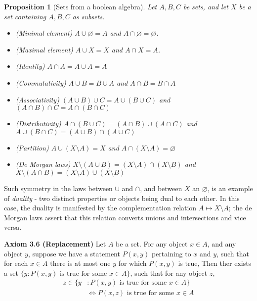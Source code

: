 \documentclass[
]{book}
\providecommand{\tightlist}{%
  \setlength{\itemsep}{0pt}\setlength{\parskip}{0pt}}
\newtheorem{proposition}{Proposition}[chapter]
\theoremstyle{definition}
\theoremstyle{definition}
\theoremstyle{definition}
\theoremstyle{definition}
\theoremstyle{remark}
\begin{document}
\begin{proposition}[Sets from a boolean algebra]

Let \(A,B,C\) be sets, and let \(X\) be a set containing \(A,B,C\) as subsets.

\begin{itemize}
\tightlist
\item
  (Minimal element) \(A\cup \varnothing = A\) and \(A \cap \varnothing = \varnothing\).
\item
  (Maximal element) \(A\cup X =X\) and \(A\cap X = A\).
\item
  (Identity) \(A\cap A = A\cup A = A\)
\item
  (Commutativity) \(A\cup B = B\cup A\) and \(A\cap B = B\cap A\)
\item
  (Associativity) \((A\cup B)\cup C = A\cup (B\cup C)\) and \((A\cap B)\cap C = A\cap (B\cap C)\)
\item
  (Distributivity) \(A\cap (B\cup C) = (A\cap B)\cup (A\cap C)\) and \(A\cup (B\cap C) = (A\cup B)\cap(A\cup C)\)
\item
  (Partition) \(A\cup (X\setminus A) = X\) and \(A\cap (X\setminus A) = \varnothing\)
\item
  (De Morgan laws) \(X\setminus (A\cup B) = (X\setminus A)\cap (X\setminus B)\) and \(X\setminus (A\cap B) = (X\setminus A)\cup (X\setminus B)\)
\end{itemize}

\end{proposition}

Such symmetry in the laws between \(\cup\) and \(\cap\), and between \(X\) an \(\varnothing\), is an example of \emph{duality} - two distinct properties or objects being dual to each other. In this case, the duality is manifested by the complementation relation \(A \mapsto X\setminus A\); the de Morgan laws assert that this relation converts unions and intersections and vice versa.

\textbf{Axiom 3.6 (Replacement)} Let \(A\) be a set. For any object \(x\in A\), and any object \(y\), suppose we have a statement \(P(x,y)\) pertaining to \(x\) and \(y\), such that for each \(x\in A\) there is at most one \(y\) for which \(P(x,y)\) is true, Then ther exists a set \(\{y: P(x,y) \text{ is true for some }x\in A\}\), such that for any object \(z\),
\[
\begin{aligned}
  z\in \{y&: P(x,y) \text{ is true for some }x\in A\}\\
  &\iff P(x,z) \text{ is true for some }x\in A
\end{aligned}
\]
\end{document}
